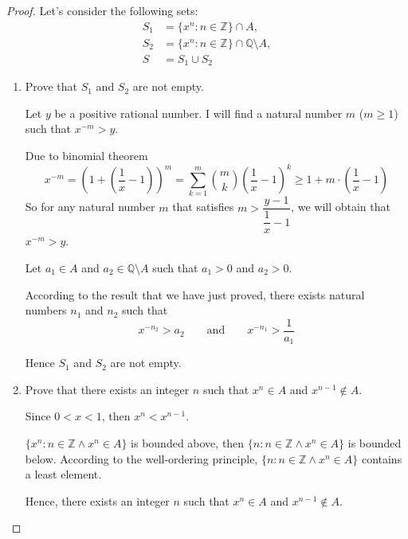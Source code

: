 \begin{proof}
    Let's consider the following sets:
    \[
        \begin{split}
            S_{1} & = \{ {x}^{n} : n\in\mathbb{Z} \} \cap A, \\
            S_{2} & = \{ {x}^{n} : n\in\mathbb{Z} \} \cap \mathbb{Q}\setminus A, \\
            S & = S_{1}\cup S_{2}
        \end{split}
    \]
    \begin{enumerate}[label={\textbf{Step \arabic*.}},itemindent=1cm]
        \item Prove that $S_{1}$ and $S_{2}$ are not empty.

              Let $y$ be a positive rational number. I will find a natural number $m$ ($m\ge 1$) such that $x^{-m} > y$.

              Due to binomial theorem
              \[
                  x^{-m} = {\left(1 + \left(\frac{1}{x} - 1\right)\right)}^{m} = \sum^{m}_{k=1}\binom{m}{k}{\left(\frac{1}{x} - 1\right)}^{k} \ge 1 + m\cdot\left(\frac{1}{x} - 1\right)
              \]
              So for any natural number $m$ that satisfies $m > \dfrac{y - 1}{\dfrac{1}{x} - 1}$, we will obtain that $x^{-m} > y$.

              Let $a_{1}\in A$ and $a_{2}\in\mathbb{Q}\setminus A$ such that $a_{1} > 0$ and $a_{2} > 0$.

              According to the result that we have just proved, there exists natural numbers $n_{1}$ and $n_{2}$ such that
              \[
                  x^{-{n}_{2}} > a_{2}\qquad\text{and}\qquad x^{-{n}_{1}} > \frac{1}{a_{1}}
              \]

              Hence $S_{1}$ and $S_{2}$ are not empty.

        \item Prove that there exists an integer $n$ such that $x^{n}\in A$ and $x^{n-1}\notin A$.

              Since $0 < x < 1$, then ${x}^{n} < {x}^{n-1}$.

              $\{ {x}^{n} : n\in\mathbb{Z}\land {x}^{n}\in A \}$ is bounded above, then $\{ n : n\in\mathbb{Z}\land {x}^{n}\in A \}$ is bounded below. According to the well-ordering principle, $\{ n : n\in\mathbb{Z}\land {x}^{n}\in A \}$ contains a least element.

              Hence, there exists an integer $n$ such that ${x}^{n}\in A$ and ${x}^{n-1}\notin A$.
    \end{enumerate}


\end{proof}

